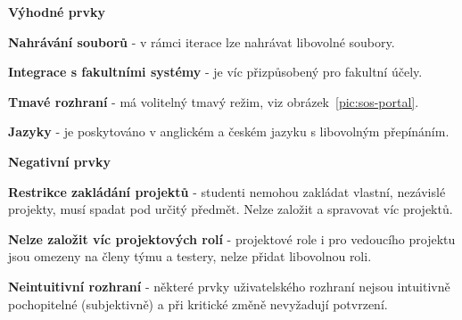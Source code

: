 \textbf{Výhodné prvky}

\begin{ul}
   \item
   \textbf{Nahrávání souborů} - v rámci iterace lze nahrávat libovolné soubory.
   \item
   \textbf{Integrace s fakultními systémy} -  je víc přizpůsobený pro fakultní účely.
   \item
   \textbf{Tmavé rozhraní} -  má volitelný tmavý režim, viz obrázek~\ref{pic:sos-portal}.
   \item
   \textbf{Jazyky} -  je poskytováno v anglickém a českém jazyku s libovolným přepínáním.
\end{ul}


\textbf{Negativní prvky}

\begin{ul}
   \item
   \textbf{Restrikce zakládání projektů} - studenti nemohou zakládat vlastní, nezávislé projekty, musí spadat pod určitý předmět.
   Nelze založit a spravovat víc projektů.
   \item
   \textbf{Nelze založit víc projektových rolí} - projektové role i pro vedoucího projektu jsou omezeny na členy týmu a testery, nelze přidat libovolnou roli.
   \item
   \textbf{Neintuitivní rozhraní} - některé prvky uživatelského rozhraní nejsou intuitivně pochopitelné (subjektivně) a při kritické změně nevyžadují potvrzení.
\end{ul}
